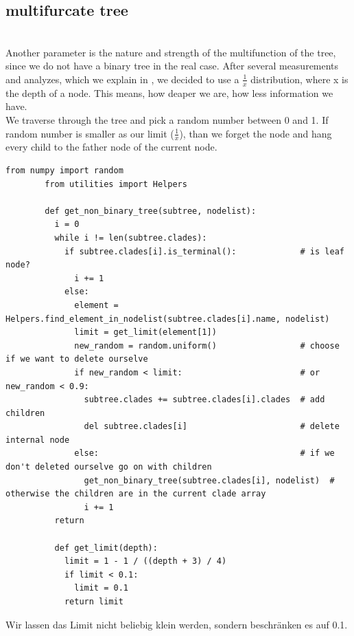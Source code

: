     \subsection{multifurcate tree}
       \\
      Another parameter is the nature and strength of the multifunction of the tree, since we do not 
        have a binary tree in the real case. After several measurements and analyzes, which we explain 
        in ,  we decided to use a $\frac{1}{x}$ distribution, where x is the depth 
        of a node. This means, how deaper we are, how less information we have. \\
      We traverse through the tree and pick a random number between 0 and 1. If random number is smaller 
        as our limit ($\frac{1}{x}$), than we forget the node and hang every child to the father node of 
        the current node. \\
      \begin{lstlisting}[gobble=6]
        from numpy import random
        from utilities import Helpers

        def get_non_binary_tree(subtree, nodelist):
          i = 0
          while i != len(subtree.clades):
            if subtree.clades[i].is_terminal():             # is leaf node?
              i += 1
            else:
              element = Helpers.find_element_in_nodelist(subtree.clades[i].name, nodelist)
              limit = get_limit(element[1])
              new_random = random.uniform()                 # choose if we want to delete ourselve
              if new_random < limit:                        # or new_random < 0.9:
                subtree.clades += subtree.clades[i].clades  # add children
                del subtree.clades[i]                       # delete internal node
              else:                                         # if we don't deleted ourselve go on with children
                get_non_binary_tree(subtree.clades[i], nodelist)  # otherwise the children are in the current clade array
                i += 1
          return

          def get_limit(depth):
            limit = 1 - 1 / ((depth + 3) / 4)
            if limit < 0.1:
              limit = 0.1
            return limit
      \end{lstlisting}
      Wir lassen das Limit nicht beliebig klein werden, sondern beschränken es auf 0.1.

